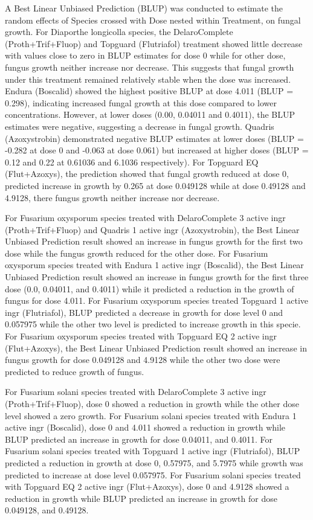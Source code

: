 \documentclass[
  10pt,
  letterpaper,
  twocolumn]{article}
\begin{document}
A Best Linear Unbiased Prediction (BLUP) was conducted to estimate the
random effects of Species crossed with Dose nested within Treatment, on
fungal growth. For Diaporthe longicolla species, the DelaroComplete
(Proth+Trif+Fluop) and Topguard (Flutriafol) treatment showed little
decrease with values close to zero in BLUP estimates for dose 0 while
for other dose, fungus growth neither increase nor decrease. This
suggests that fungal growth under this treatment remained relatively
stable when the dose was increased. Endura (Boscalid) showed the highest
positive BLUP at dose 4.011 (BLUP = 0.298), indicating increased fungal
growth at this dose compared to lower concentrations. However, at lower
doses (0.00, 0.04011 and 0.4011), the BLUP estimates were negative,
suggesting a decrease in fungal growth. Quadris (Azoxystrobin)
demonstrated negative BLUP estimates at lower doses (BLUP = -0.282 at
dose 0 and -0.063 at dose 0.061) but increased at higher doses (BLUP =
0.12 and 0.22 at 0.61036 and 6.1036 respectively). For Topguard EQ
(Flut+Azoxys), the prediction showed that fungal growth reduced at dose
0, predicted increase in growth by 0.265 at dose 0.049128 while at dose
0.49128 and 4.9128, there fungus growth neither increase nor decrease.

For Fusarium oxysporum species treated with DelaroComplete 3 active ingr
(Proth+Trif+Fluop) and Quadris 1 active ingr (Azoxystrobin), the Best
Linear Unbiased Prediction result showed an increase in fungus growth
for the first two dose while the fungus growth reduced for the other
dose. For Fusarium oxysporum species treated with Endura 1 active ingr
(Boscalid), the Best Linear Unbiased Prediction result showed an
increase in fungus growth for the first three dose (0.0, 0.04011, and
0.4011) while it predicted a reduction in the growth of fungus for dose
4.011. For Fusarium oxysporum species treated Topguard 1 active ingr
(Flutriafol), BLUP predicted a decrease in growth for dose level 0 and
0.057975 while the other two level is predicted to increase growth in
this specie. For Fusarium oxysporum species treated with Topguard EQ 2
active ingr (Flut+Azoxys), the Best Linear Unbiased Prediction result
showed an increase in fungus growth for dose 0.049128 and 4.9128 while
the other two dose were predicted to reduce growth of fungus.

For Fusarium solani species treated with DelaroComplete 3 active ingr
(Proth+Trif+Fluop), dose 0 showed a reduction in growth while the other
dose level showed a zero growth. For Fusarium solani species treated
with Endura 1 active ingr (Boscalid), dose 0 and 4.011 showed a
reduction in growth while BLUP predicted an increase in growth for dose
0.04011, and 0.4011. For Fusarium solani species treated with Topguard 1
active ingr (Flutriafol), BLUP predicted a reduction in growth at dose
0, 0.57975, and 5.7975 while growth was predicted to increase at dose
level 0.057975. For Fusarium solani species treated with Topguard EQ 2
active ingr (Flut+Azoxys), dose 0 and 4.9128 showed a reduction in
growth while BLUP predicted an increase in growth for dose 0.049128, and
0.49128.
\end{document}
